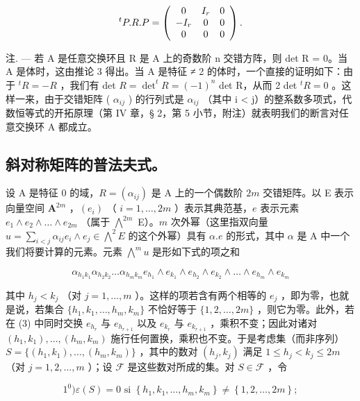 \[
{ } ^ { t } P . R . P = \left( \begin{array} { c c c } 0 & I _ { r } & 0 \\ - I _ { r } & 0 & 0 \\ 0 & 0 & 0 \end{array} \right) .
\]

注. --- 若 A 是任意交换环且 R 是 A 上的奇数阶 n 交错方阵，则 det R = 0。当 A 是体时，这由推论 3 得出。当 A 是特征 ≠ 2 的体时，一个直接的证明如下：由于 \(^tR = -R\) ，我们有 det \(R = \det ^t R = (-1)^n\) det R，从而 2 det \(^tR = 0\) 。这样一来，由于交错矩阵 ( \(\alpha_{ij}\) ) 的行列式是 \(\alpha_{ij}\) （其中 i \textless{} j）的整系数多项式，代数恒等式的开拓原理（第 IV 章，§ 2，第 5 小节，附注）就表明我们的断言对任意交换环 A 都成立。

\subsection{斜对称矩阵的普法夫式。}

设 A 是特征 0 的域，\(R = (\alpha_{ij})\) 是 A 上的一个偶数阶 \(2m\) 交错矩阵。以 E 表示向量空间 \(\mathbf{A}^{2m}\) ，\((e_i)\) （ \(i = 1, \ldots, 2m\) ）表示其典范基，\(e\) 表示元素 \(e_1 \wedge e_2 \wedge \ldots \wedge e_{2m}\) （属于 \(\bigwedge^{2m}\) E）。\(m\) 次外幂（这里指双向量 \(u = \sum_{i < j} \alpha_{ij} e_i \wedge e_j \in \bigwedge^2 E\) 的这个外幂）具有 \(\alpha.e\) 的形式，其中 \(\alpha\) 是 A 中一个我们将要计算的元素。元素 \(\bigwedge^m u\) 是形如下式的项之和

\[
\alpha_ {h _ {1} k _ {1}} \alpha_ {h _ {2} k _ {2}} \dots \alpha_ {h _ {m} k _ {m}} e _ {h _ {1}} \wedge e _ {k _ {1}} \wedge e _ {h _ {2}} \wedge e _ {k _ {2}} \wedge \dots \wedge e _ {h _ {m}} \wedge e _ {k _ {m}}\tag{3}
\]

其中 \(h_j < k_j\) （对 \(j = 1, \ldots, m\) ）。这样的项若含有两个相等的 \(e_j\) ，即为零，也就是说，若集合 \(\{h_1, k_1, \ldots, h_m, k_m\}\) 不恰好等于 \(\{1, 2, \ldots, 2m\}\) ，则它为零。此外，若在 (3) 中同时交换 \(e_{h_r}\) 与 \(e_{h_{r+1}}\) 以及 \(e_{k_r}\) 与 \(e_{k_{r+1}}\) ，乘积不变；因此对诸对 \((h_1, k_1), \ldots, (h_m, k_m)\) 施行任何置换，乘积也不变。于是考虑集（而非序列）\(S = \{(h_1, k_1), \ldots, (h_m, k_m)\}\) ，其中的数对 \((h_j, k_j)\) 满足 \(1 \leqslant h_j < k_j \leqslant 2m\) （对 \(j = 1, 2, \ldots, m\) ）；设 \(\mathscr{F}\) 是这些数对所成的集。对 \(S \in \mathscr{F}\) ，令

\[
1 ^ {0}) \varepsilon (S) = 0 \text {   si   } \left\{h _ {1}, k _ {1}, \dots , h _ {m}, k _ {m} \right\} \neq \left\{1, 2, \dots , 2 m \right\};
\]


